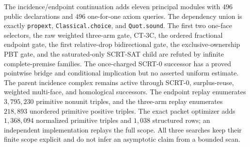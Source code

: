 \documentclass[11pt]{amsart}
\theoremstyle{definition}
\theoremstyle{remark}
\begin{document}
The incidence/endpoint continuation adds eleven principal modules with $496$
public declarations and $496$ one-for-one axiom queries.  The dependency
union is exactly
\texttt{propext}, \texttt{Classical.\allowbreak choice}, and
\texttt{Quot.sound}.  The first two one-face selectors, the raw weighted
three-arm gate, CT-3C, the ordered fractional endpoint gate, the first
relative-drop bidirectional gate, the exclusive-ownership PBT gate, and the
saturated-only SCRT-SAT child are refuted by infinite complete-premise
families.  The once-charged SCRT-0 successor has a proved pointwise bridge and
conditional implication but no asserted uniform estimate.  The parent
incidence complex remains active through SCRT-0, surplus-reuse, weighted
multi-face, and homological successors.
The endpoint replay enumerates $3{,}795{,}230$ primitive nonunit triples, and
the three-arm replay enumerates $218{,}893$ unordered primitive positive
triples.  The exact packet optimizer adds $1{,}368{,}094$ normalized primitive
triples and $1{,}038$ structured rows; an independent implementation replays
the full scope.  All three searches keep their finite scope explicit and do
not infer an asymptotic claim from a bounded scan.
\end{document}
